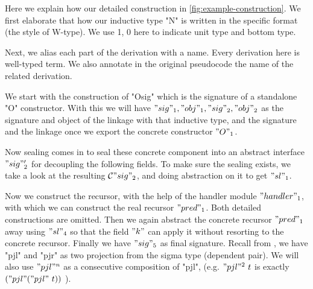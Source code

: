 Here we explain how  our detailed construction in
\cref{fig:example-construction}. We first elaborate that
how our inductive type "N" is written in the specific format (the style
of W-type). We use 1, 0 here to indicate unit type and bottom type. 

Next, we alias each part of the derivation with a name. Every derivation
here is well-typed term. We also annotate in the original pseudocode the
name of the related derivation. 

We start with the construction of "Osig" which is the signature of a
standalone "O" constructor. With this we will have $"sig"_1, "obj"_1,
"sig"_2, "obj"_2$ as the signature and object of the linkage with that
inductive type, and the signature and the linkage once we export the
concrete constructor $"O"_1$. 

Now sealing comes in to seal these concrete component into an abstract
interface $"sig"_2'$ for decoupling the following fields. To make sure
the sealing exists, we take a look at the resulting ${\mathcal{C}} "sig"_2$, and
doing abstraction on it to get $"sl"_1$. 

Now we construct the recursor, with the help of the handler module
$"handler"_1$, with which we can construct the real recursor $"pred"_1$.
Both detailed constructions are omitted. Then we again abstract the
concrete recursor $"pred"_1$ away using $"sl"_4$ so that the field $"k"$
can apply it without resorting to the concrete recursor. Finally we
have $"sig"_5$ as final signature. Recall from , we have "pjl" and "pjr" as two projection from the sigma type (dependent pair). We will also use $"pjl"^n$ as a consecutive composition of "pjl", (e.g. $"pjl"^2~t$ is exactly $("pjl" ("pjl"~t))$ ). 

